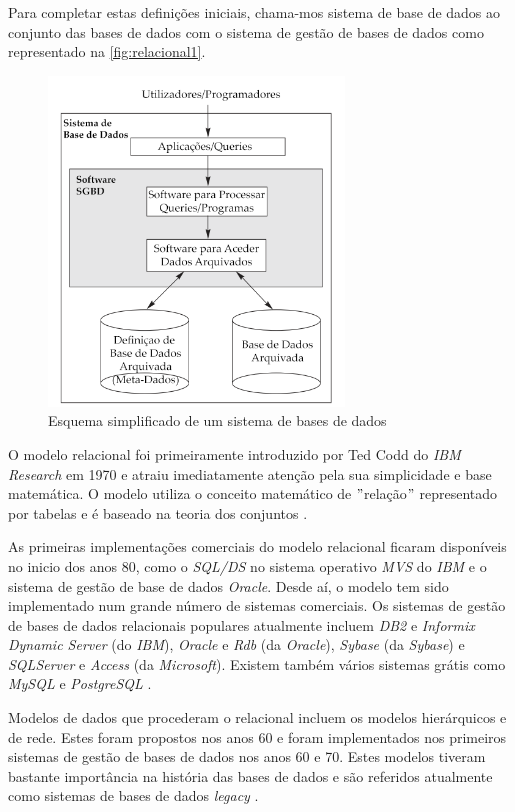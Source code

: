 \documentclass[11pt,twoside,a4paper]{report}
\begin{document}
Para completar estas definições iniciais, chama-mos sistema de base de dados ao conjunto das bases de dados com o sistema de gestão de bases de dados como representado na \autoref{fig:relacional1}.
\begin{figure}[H]
	\begin{center}
		\includegraphics[width=0.7\textwidth]{SGBD} %
		\caption[Esquema de um sistema de bases de dados]{Esquema simplificado de um sistema de bases de dados}
		\label{fig:relacional1}
	\end{center}
\end{figure}
O modelo relacional foi primeiramente introduzido por Ted Codd do \textit{IBM Research} em 1970 \cite{Elmasri:2010:FDS:1855347,Codd} e atraiu imediatamente atenção pela sua simplicidade e base matemática. O modelo utiliza o conceito matemático de $ " $relação$ " $ representado por tabelas e é baseado na teoria dos conjuntos \cite{Elmasri:2010:FDS:1855347}.\par
As primeiras implementações comerciais do modelo relacional ficaram disponíveis no inicio dos anos 80, como o \textit{SQL/DS} no sistema operativo \textit{MVS} do \textit{IBM} e o sistema de gestão de base de dados \textit{Oracle}. Desde aí, o modelo tem sido implementado num grande número de sistemas comerciais. Os sistemas de gestão de bases de dados relacionais populares atualmente incluem \textit{DB2} e \textit{Informix Dynamic Server} (do \textit{IBM}), \textit{Oracle} e \textit{Rdb} (da \textit{Oracle}), \textit{Sybase} (da \textit{Sybase}) e \textit{SQLServer} e \textit{Access} (da \textit{Microsoft}). Existem também vários sistemas grátis como \textit{MySQL} e \textit{PostgreSQL} \cite{Elmasri:2010:FDS:1855347}.\par
Modelos de dados que procederam o relacional incluem os modelos hierárquicos e de rede. Estes foram propostos nos anos 60 e foram implementados nos primeiros sistemas de gestão de bases de dados nos anos 60 e 70. Estes modelos tiveram bastante importância na história das bases de dados e são referidos atualmente como sistemas de bases de dados \textit{legacy} \cite{Elmasri:2010:FDS:1855347}.
\end{document}
